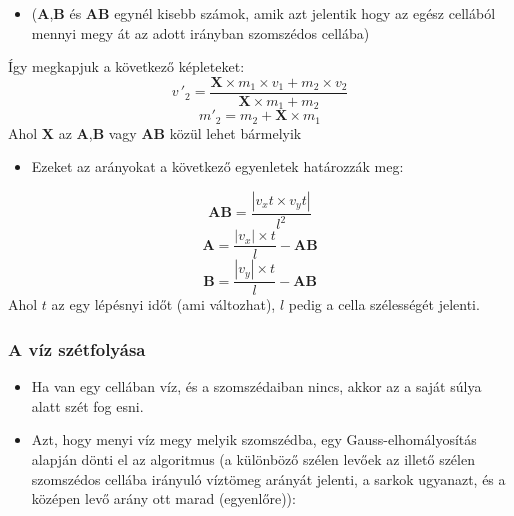 \documentclass{beamer}
\begin{document}
	\begin{frame}
	\begin{itemize}\item($\mathbf{A}$,$\mathbf{B}$ és $\mathbf{AB}$ egynél kisebb számok, amik azt jelentik hogy az egész cellából mennyi megy át az adott irányban szomszédos cellába)\end{itemize}
				\center{}
	\end{frame}
	\begin{frame}
		Így megkapjuk a következő képleteket:
		\begin{equation}
			v\,'_2=\frac{\mathbf{X}\times m_1\times v_1 + m_2\times v_2}{\mathbf{X}\times m_1 + m_2}
		\end{equation}
		\begin{equation}
			m'_2=m_2+\mathbf{X}\times m_1
		\end{equation}
		Ahol $\mathbf{X}$ az $\mathbf{A}$,$\mathbf{B}$ vagy $\mathbf{AB}$ közül lehet bármelyik
	\end{frame}
	\begin{frame}
		\begin{itemize}
			\item Ezeket az arányokat a következő egyenletek határozzák meg:
		\end{itemize}
		\begin{equation}
			\mathbf{AB} = \frac{|v_x t \times v_y t|}{l^2}
		\end{equation}
		\begin{equation}
			\mathbf{A} = \frac{|v_x|\times t}{l}-\mathbf{AB}
		\end{equation}
		\begin{equation}
			\mathbf{B} = \frac{|v_y|\times t}{l}-\mathbf{AB}
		\end{equation}
		Ahol $t$ az egy lépésnyi időt (ami változhat), $l$ pedig a cella szélességét jelenti.
	\end{frame}
	\begin{frame}
		\frametitle{A víz szétfolyása}
		\begin{itemize}
			\item Ha van egy cellában víz, és a szomszédaiban nincs, akkor az a saját súlya alatt szét fog esni.
		\end{itemize}
		\center{}
	\end{frame}
	\begin{frame}
		\begin{itemize}
			\item Azt, hogy menyi víz megy melyik szomszédba, egy Gauss-elhomályosítás alapján dönti el az algoritmus (a különböző szélen levőek az illető szélen szomszédos cellába irányuló víztömeg arányát jelenti, a sarkok ugyanazt, és a középen levő arány ott marad (egyenlőre)):
		\end{itemize}
			
	\end{frame}
\end{document}
